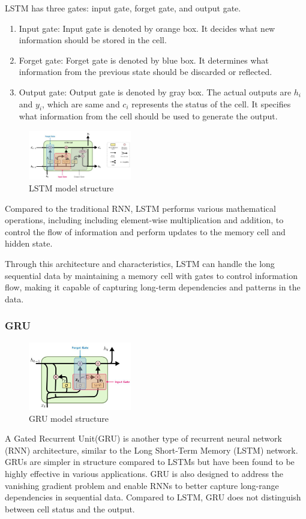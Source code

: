 LSTM has three gates: input gate, forget gate, and output gate.
\begin{enumerate}
	\item Input gate: 	Input gate is denoted by orange box. It decides what new information should be stored in the cell.
	\item Forget gate:	Forget gate is denoted by blue box. It determines what information from the previous state should be discarded or reflected.
	\item Output gate:	Output gate is denoted by gray box. The actual outputs are $h_{i}$ and $y_{i}$, which are same and $c_{i}$ represents the status of the cell. It specifies what information from the cell should be used to generate the output.
\end{enumerate}

\begin{figure}
	\includegraphics[width=0.4\textwidth]{Fig/LSTM.jpg}
	\caption{LSTM model structure}
\end{figure}
Compared to the traditional RNN, LSTM performs various mathematical operations, including including element-wise multiplication and addition, to control the flow of information and perform updates to the memory cell and hidden state.

Through this architecture and characteristics, LSTM can handle the long sequential data by maintaining a memory cell with gates to control information flow, 
making it capable of capturing long-term dependencies and patterns in the data.

\subsubsection{GRU}

\begin{figure}
	\includegraphics[width=0.4\textwidth]{Fig/GRU.jpg}
	\caption{GRU model structure}
\end{figure}
A Gated Recurrent Unit(GRU) is another type of recurrent neural network (RNN) architecture, 
similar to the Long Short-Term Memory (LSTM) network. 
GRUs are simpler in structure compared to LSTMs but have been found to be highly effective in various applications. 
GRU is also designed to address the vanishing gradient problem and enable RNNs to better capture long-range dependencies in sequential data. 
Compared to LSTM, GRU does not distinguish between cell status and the output.


